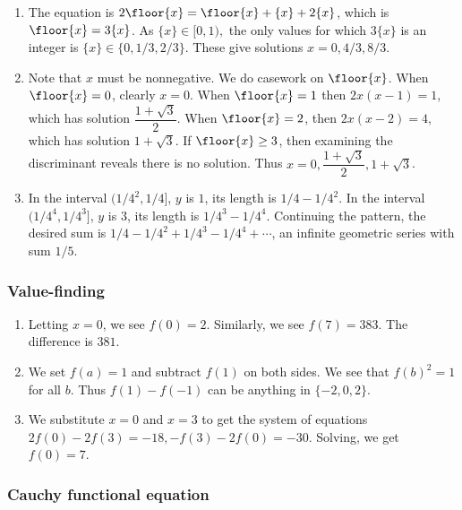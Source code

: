 \documentclass[10pt,paper=letter]{scrartcl}
\begin{document}
\begin{enumerate}

\item The equation is $2\floor{x} = \floor{x} + \{x\} + 2\{x\}$, which is $\floor{x} = 3\{x\}$. As $\{x\} \in [0, 1),$ the only values for which $3\{x\}$ is an integer is $\{x\} \in \{0, 1/3, 2/3\}$. These give solutions $x = 0, 4/3, 8/3$.

\item Note that $x$ must be nonnegative. We do casework on $\floor{x}$. When $\floor{x} = 0$, clearly $x = 0$. When $\floor{x} = 1$ then $2x(x-1) = 1$, which has solution $\dfrac{1+\sqrt{3}}{2}$. When $\floor{x} = 2$, then $2x(x-2) = 4$, which has solution $1+\sqrt{3}$. If $\floor{x} \geq 3$, then examining the discriminant reveals there is no solution. Thus $x = 0, \dfrac{1+\sqrt{3}}{2}, 1+\sqrt{3}$.

\item In the interval $(1/4^2, 1/4]$, $y$ is $1$, its length is $1/4 - 1/4^2$. In the interval $(1/4^4, 1/4^3]$, $y$ is $3$, its length is $1/4^3 - 1/4^4$. Continuing the pattern, the desired sum is $1/4 - 1/4^2 + 1/4^3 - 1/4^4 + \cdots$, an infinite geometric series with sum $1/5$.

\end{enumerate}

\subsubsection*{Value-finding}

\begin{enumerate}

\item Letting $x = 0$, we see $f(0) = 2$. Similarly, we see $f(7) = 383$. The difference is $381$.

\item We set $f(a) = 1$ and subtract $f(1)$ on both sides. We see that $f(b)^2 = 1$ for all $b$. Thus $f(1) - f(-1)$ can be anything in $\{-2, 0, 2\}$.

\item We substitute $x = 0$ and $x = 3$ to get the system of equations $2f(0) - 2f(3) = -18, -f(3) - 2f(0) = -30$. Solving, we get $f(0) = 7$.

\end{enumerate}

\subsubsection*{Cauchy functional equation}
\end{document}
